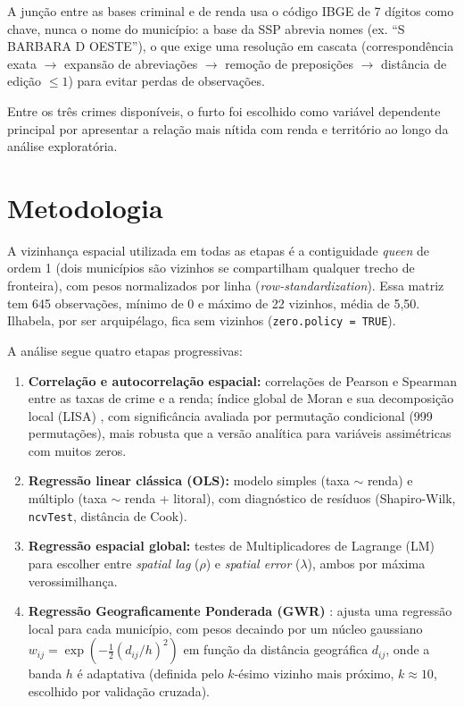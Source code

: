 \documentclass[conference]{IEEEtran}
\begin{document}
A junção entre as bases criminal e de renda usa o código IBGE de 7 dígitos
como chave, nunca o nome do município: a base da SSP abrevia nomes (ex.
``S BARBARA D OESTE''), o que exige uma resolução em cascata (correspondência
exata $\rightarrow$ expansão de abreviações $\rightarrow$ remoção de
preposições $\rightarrow$ distância de edição $\leq 1$) para evitar perdas de
observações.

Entre os três crimes disponíveis, o furto foi escolhido como variável
dependente principal por apresentar a relação mais nítida com renda e
território ao longo da análise exploratória.

\section{Metodologia}

A vizinhança espacial utilizada em todas as etapas é a contiguidade
\textit{queen} de ordem 1 (dois municípios são vizinhos se compartilham
qualquer trecho de fronteira), com pesos normalizados por linha
(\textit{row-standardization}). Essa matriz tem 645 observações, mínimo de 0
e máximo de 22 vizinhos, média de 5,50. Ilhabela, por ser arquipélago, fica
sem vizinhos (\texttt{zero.policy = TRUE}).

A análise segue quatro etapas progressivas:

\begin{enumerate}
\item \textbf{Correlação e autocorrelação espacial:} correlações de Pearson
e Spearman entre as taxas de crime e a renda; índice global de Moran
\cite{moran1950} e sua decomposição local (LISA) \cite{anselin1995}, com
significância avaliada por permutação condicional (999 permutações), mais
robusta que a versão analítica para variáveis assimétricas com muitos zeros.
\item \textbf{Regressão linear clássica (OLS):} modelo simples
(taxa $\sim$ renda) e múltiplo (taxa $\sim$ renda + litoral), com diagnóstico
de resíduos (Shapiro-Wilk, \texttt{ncvTest}, distância de Cook).
\item \textbf{Regressão espacial global:} testes de Multiplicadores de
Lagrange (LM) para escolher entre \textit{spatial lag} ($\rho$) e
\textit{spatial error} ($\lambda$), ambos por máxima verossimilhança.
\item \textbf{Regressão Geograficamente Ponderada (GWR)} \cite{fotheringham2002}:
ajusta uma regressão local para cada município, com pesos decaindo por um
núcleo gaussiano $w_{ij} = \exp\left(-\frac{1}{2}(d_{ij}/h)^2\right)$ em
função da distância geográfica $d_{ij}$, onde a banda $h$ é adaptativa
(definida pelo $k$-ésimo vizinho mais próximo, $k \approx 10$, escolhido por
validação cruzada).
\end{enumerate}
\end{document}
